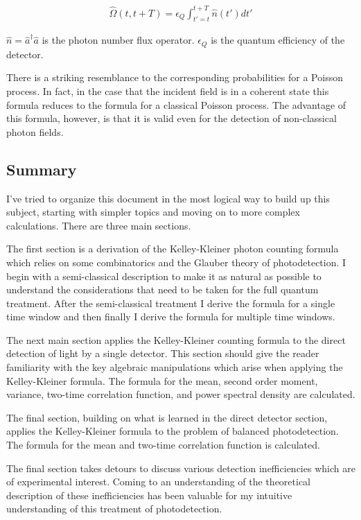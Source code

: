 \documentclass[12pt]{article}
\begin{document}
\begin{align}
\hat{\Omega}(t,t+T) = \epsilon_Q \int_{t'=t}^{t+T} \hat{n}(t') dt'
\end{align}

 $\hat{n} = \hat{a}^{\dag} \hat{a}$ is the photon number flux operator. $\epsilon_Q$ is the quantum efficiency of the detector.

There is a striking resemblance to the corresponding probabilities for a Poisson process. In fact, in the case that the incident field is in a coherent state this formula reduces to the formula for a classical Poisson process. The advantage of this formula, however, is that it is valid even for the detection of non-classical photon fields. 

\subsection{Summary}

I've tried to organize this document in the most logical way to build up this subject, starting with simpler topics and moving on to more complex calculations. There are three main sections. 

The first section is a derivation of the Kelley-Kleiner photon counting formula which relies on some combinatorics and the Glauber theory of photodetection. I begin with a semi-classical description to make it as natural as possible to understand the considerations that need to be taken for the full quantum treatment. After the semi-classical treatment I derive the formula for a single time window and then finally I derive the formula for multiple time windows.

The next main section applies the Kelley-Kleiner counting formula to the direct detection of light by a single detector. This section should give the reader familiarity with the key algebraic manipulations which arise when applying the Kelley-Kleiner formula. The formula for the mean, second order moment, variance, two-time correlation function, and power spectral density are calculated.

The final section, building on what is learned in the direct detector section, applies the Kelley-Kleiner formula to the problem of balanced photodetection. The formula for the mean and two-time correlation function is calculated.

The final section takes detours to discuss various detection inefficiencies which are of experimental interest. Coming to an understanding of the theoretical description of these inefficiencies has been valuable for my intuitive understanding of this treatment of photodetection.
\end{document}
